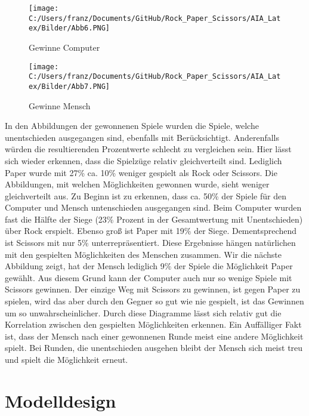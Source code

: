 \documentclass[thesis=paper,fancy]{hsmw-thesis}
\begin{document}
\begin{figure}[h]
   \begin{minipage}[b]{.45\linewidth} %
      \texttt{[image: C:/Users/franz/Documents/GitHub/Rock\_Paper\_Scissors/AIA\_Latex/Bilder/Abb6.PNG]}
      \caption{Gewinne Computer}
   \end{minipage}
   \hspace{.1\linewidth}%
   \begin{minipage}[b]{.45\linewidth} %
      \texttt{[image: C:/Users/franz/Documents/GitHub/Rock\_Paper\_Scissors/AIA\_Latex/Bilder/Abb7.PNG]}
      \caption{Gewinne Mensch}
   \end{minipage}
\end{figure}

In den Abbildungen der gewonnenen Spiele wurden die Spiele, welche unentschieden ausgegangen sind, ebenfalls mit Berücksichtigt. Anderenfalls würden die resultierenden Prozentwerte schlecht zu vergleichen sein.
Hier lässt sich wieder erkennen, dass die Spielzüge relativ gleichverteilt sind. Lediglich Paper wurde mit 27\% ca. 10\% weniger gespielt als Rock oder Scissors. Die Abbildungen, mit welchen Möglichkeiten gewonnen wurde, sieht weniger gleichverteilt aus. Zu Beginn ist zu erkennen, dass ca. 50\% der Spiele für den Computer und Mensch untenschieden ausgegangen sind. Beim Computer wurden fast die Hälfte der Siege (23\% Prozent in der Gesamtwertung mit Unentschieden) über Rock erspielt. Ebenso groß ist Paper mit 19\% der Siege. Dementsprechend ist Scissors mit nur 5\% unterrepräsentiert. Diese Ergebnisse hängen natürlichen mit den gespielten Möglichkeiten des Menschen zusammen. Wir die nächste Abbildung zeigt, hat der Mensch lediglich 9\% der Spiele die Möglichkeit Paper gewählt.
Aus diesem Grund kann der Computer auch nur so wenige Spiele mit Scissors gewinnen. Der einzige Weg mit Scissors zu gewinnen, ist gegen Paper zu spielen, wird das aber durch den Gegner so gut wie nie gespielt, ist das Gewinnen um so unwahrscheinlicher. Durch diese Diagramme lässt sich relativ gut die Korrelation zwischen den gespielten Möglichkeiten erkennen. Ein Auffälliger Fakt ist, dass der Mensch nach einer gewonnenen Runde meist eine andere Möglichkeit spielt. Bei Runden, die unentschieden ausgehen bleibt der Mensch sich meist treu und spielt die Möglichkeit erneut.

\chapter{Modelldesign}
\end{document}

